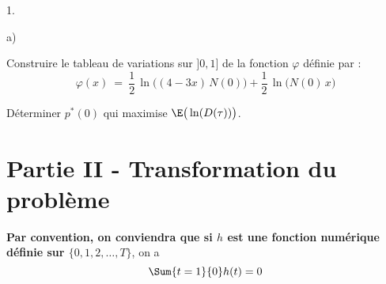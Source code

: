 \begin{noliste}{1.}
\begin{noliste}{a)}
    
    \item Construire le tableau de variations sur $]0,1]$ de la 
    fonction $\varphi$ définie par :
    \[
      \varphi(x) \ = \ \dfrac{1}{2} \, \ln\big((4-3x) \, N(0)\big) 
      + \dfrac{1}{2} \, \ln\big(N(0) \, x\big)
    \]
    
    
    
    

    
    \item Déterminer $p^*(0)$ qui maximise $\E\big(\ln(D(\tau))\big)$.
    
    
  \end{noliste}
\end{noliste}


\newpage

\section*{Partie II - Transformation du problème}

\noindent
{\bf Par convention, on conviendra que si $h$ est une fonction 
numérique définie sur $\{0,1,2, \ldots, T\}$}, on a
\[
  \Sum{t=1}{0} h(t)=0
\]


